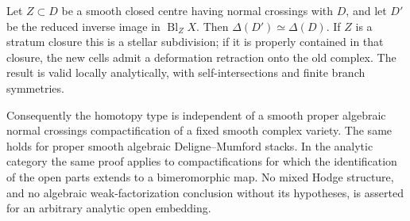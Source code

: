 \begin{theorem}
\label{P4c1}
Let $Z\subset D$ be a smooth closed centre having normal crossings with $D$, and let $D'$ be the reduced inverse image in $\operatorname{Bl}_ZX$.  Then $\Delta(D')\simeq\Delta(D)$.  If $Z$ is a stratum closure this is a stellar subdivision; if it is properly contained in that closure, the new cells admit a deformation retraction onto the old complex.  The result is valid locally analytically, with self-intersections and finite branch symmetries.

Consequently the homotopy type is independent of a smooth proper algebraic normal crossings compactification of a fixed smooth complex variety.  The same holds for proper smooth algebraic Deligne--Mumford stacks.  In the analytic category the same proof applies to compactifications for which the identification of the open parts extends to a bimeromorphic map.  No mixed Hodge structure, and no algebraic weak-factorization conclusion without its hypotheses, is asserted for an arbitrary analytic open embedding.
\end{theorem}
